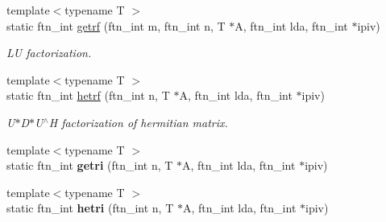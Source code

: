\begin{DoxyCompactItemize}
{\footnotesize template$<$typename T $>$ }\\static ftn\+\_\+int \hyperlink{classsddk_1_1linalg_3_01_c_p_u_01_4_aea27843f168c199a84453b6ddee21087}{getrf} (ftn\+\_\+int m, ftn\+\_\+int n, T $\ast$A, ftn\+\_\+int lda, ftn\+\_\+int $\ast$ipiv)
\begin{DoxyCompactList}\small\item\em L\+U factorization. \end{DoxyCompactList}\item 
{\footnotesize template$<$typename T $>$ }\\static ftn\+\_\+int \hyperlink{classsddk_1_1linalg_3_01_c_p_u_01_4_a8da0ecedc8aba051332e560893e6f127}{hetrf} (ftn\+\_\+int n, T $\ast$A, ftn\+\_\+int lda, ftn\+\_\+int $\ast$ipiv)
\begin{DoxyCompactList}\small\item\em U$\ast$\+D$\ast$\+U$^\wedge$\+H factorization of hermitian matrix. \end{DoxyCompactList}\item 
\hypertarget{classsddk_1_1linalg_3_01_c_p_u_01_4_a059f53781229ea6595c0c842334466c3}{}{\footnotesize template$<$typename T $>$ }\\static ftn\+\_\+int {\bfseries getri} (ftn\+\_\+int n, T $\ast$A, ftn\+\_\+int lda, ftn\+\_\+int $\ast$ipiv)\label{classsddk_1_1linalg_3_01_c_p_u_01_4_a059f53781229ea6595c0c842334466c3}

\item 
\hypertarget{classsddk_1_1linalg_3_01_c_p_u_01_4_ab6f5cfae2e1adfce7044f6d59d0c9728}{}{\footnotesize template$<$typename T $>$ }\\static ftn\+\_\+int {\bfseries hetri} (ftn\+\_\+int n, T $\ast$A, ftn\+\_\+int lda, ftn\+\_\+int $\ast$ipiv)\label{classsddk_1_1linalg_3_01_c_p_u_01_4_ab6f5cfae2e1adfce7044f6d59d0c9728}


\end{DoxyCompactItemize}
